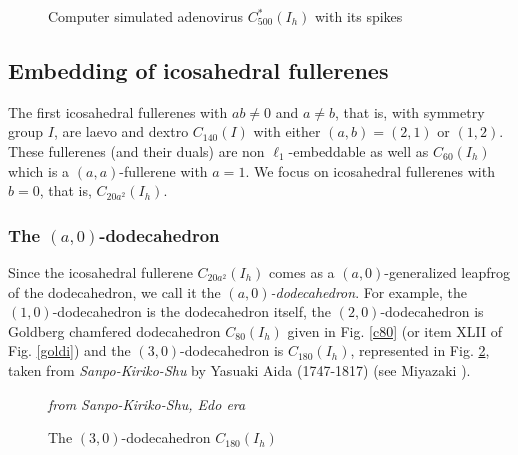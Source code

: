 \begin{figure}[hb]
\begin{center}
\caption{Computer simulated adenovirus $C^*_{500}(I_h)$ with its spikes}\label{adenovirus}

\end{center}
\end{figure}

\newpage
\subsection{Embedding of icosahedral fullerenes}
The first icosahedral fullerenes with $ab\neq 0$ and $a\neq b$, that is, with 
symmetry group $I$, are laevo and dextro $C_{140}(I)$
with either $(a,b)=(2,1)$ or $(1,2)$. These fullerenes (and their duals) are
non $\ell_1$-embeddable as well as $C _{60}(I_h)$ 
which is a $(a,a)$-fullerene with $a=1$. We focus on
icosahedral fullerenes with $b=0$, that is, $C_{20a^2}(I_h)$.

\subsubsection{The $(a,0)$-dodecahedron}
Since the icosahedral fullerene $C_{20a^2}(I_h)$ comes as a $(a,0)$-generalized 
leapfrog of the dodecahedron, we call it the {\it 
$(a,0)$-dodecahedron}.  
For example, the $(1,0)$-dodecahedron is the dodecahedron itself, the 
$(2,0)$-dodecahedron is Goldberg chamfered dodecahedron $C_{80}(I_h)$ given in
Fig. \ref{c80} (or item XLII of Fig. \ref{goldi}) and the $(3,0)$-dodecahedron 
is $C_{180}(I_h)$, represented in 
Fig. \ref{edo}, taken from {\it Sanpo-Kiriko-Shu} by {\sc Yasuaki Aida} 
(1747-1817) (see {\sc Miyazaki} \cite{m92}).

\begin{figure}[hbt]
\begin{center}
\caption{The $(3,0)$-dodecahedron $C_{180}(I_h)$}\label{edo}

{\it from Sanpo-Kiriko-Shu, Edo era}
\end{center}
\end{figure}


